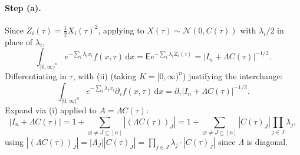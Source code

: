 \documentclass[14pt]{extarticle}
\theoremstyle{definition}
\newcommand{\EE}{\mathsf{E}}
\newcommand{\dd}{\mathrm{d}}
\newcommand{\caln}{\mathcal{N}}
\begin{document}
\paragraph{Step (a).}  Since $Z_i(\tau)=\tfrac12 X_i(\tau)^2$, applying
 to $X(\tau)\sim\caln(0,C(\tau))$ with $\lambda_i/2$ in
place of $\lambda_i$,
\[
  \int_{[0,\infty)^n}e^{-\sum_i\lambda_ix_i}f(x,\tau)\,\dd x
  =\EE e^{-\sum_i\lambda_iZ_i(\tau)}
  =|I_n+\Lambda C(\tau)|^{-1/2}.
\]
Differentiating in $\tau$, with (ii) (taking $K=[0,\infty)^n$)
justifying the interchange:
\begin{equation}\label{eq:lt_deriv}
  \int_{[0,\infty)^n}e^{-\sum_i\lambda_ix_i}
  \partial_\tau f(x,\tau)\,\dd x
  =\partial_\tau|I_n+\Lambda C(\tau)|^{-1/2}.
\end{equation}
Expand via (i) applied to $A=\Lambda C(\tau)$:
\begin{equation}\label{eq:det_expansion}
  |I_n+\Lambda C(\tau)|
  =1+\sum_{\varnothing\ne J\subseteq[n]}|(\Lambda C(\tau))_J|
  =1+\sum_{\varnothing\ne J\subseteq[n]}|C(\tau)_J|\prod_{j\in J}\lambda_j,
\end{equation}
using $|(\Lambda C(\tau))_J|=|\Lambda_J||C(\tau)_J|=\prod_{j\in J}\lambda_j\cdot|C(\tau)_J|$
since $\Lambda$ is diagonal.
\end{document}
